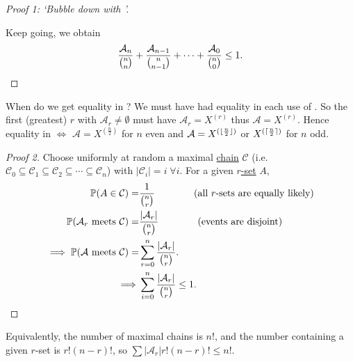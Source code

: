 \documentclass{article}
\DeclarePairedDelimiter\ceil{\lceil}{\rceil}
\DeclarePairedDelimiter\floor{\lfloor}{\rfloor}
\newcommand{\ihalf}[1]{\floor{\frac{#1}{2}}}
\newcommand{\ihalfc}[1]{\ceil{\frac{#1}{2}}}
\let\subset\subseteq
\begin{document}
\begin{proof}[Proof 1: `Bubble down with ']
\begin{center}
  \end{center}
  Keep going, we obtain
  \begin{equation*}
    \frac{\mathcal{A}_n}{\binom{n}{n}} + \frac{\mathcal{A}_{n-1}}{\binom{n}{n-1}} + \dotsm + \frac{\mathcal{A}_0}{\binom{n}{0}} \leq 1. \qedhere
  \end{equation*}
\end{proof}

When do we get equality in ?
We must have had equality in each use of .
So the first (greatest) $r$ with $\mathcal{A}_r \neq \emptyset$ must have $\mathcal{A}_r = X^{(r)}$ thus $\mathcal{\mathcal{A}} = X^{(r)}$.
Hence equality in  $\iff$ $\mathcal{A} = X^{(\frac{n}{2})}$ for $n$ even and $\mathcal{A} = X^{(\ihalf{n})}$ or $X^{(\ihalfc{n})}$ for $n$ odd.

\begin{proof}[Proof 2]
  Choose uniformly at random a maximal \hyperlink{def:chain}{chain} $\mathcal{C}$ (i.e.\ $\mathcal{C}_0 \subset \mathcal{C}_1 \subset \mathcal{C}_2 \subset \dotsb \subset \mathcal{C}_n$) with $|\mathcal{C}_i| = i \; \forall i$.
  For a given \hyperlink{def:superr}{$r$-set} $A$,
 \begin{align*}\mathbb{P}(A \in \mathcal{C}) = &\frac{1}{\binom{n}{r}} \qquad \qquad \text{(all $r$-sets are equally likely)} \\
    \mathbb{P}(\mathcal{A}_r \text{ meets } \mathcal{C}) = &\frac{|\mathcal{A}_r|}{\binom{n}{r}} \qquad \qquad \text{(events are disjoint)} \\
    \implies \mathbb{P}(\mathcal{A} \text{ meets }\mathcal{C}) = &\sum_{r=0}^n \frac{|\mathcal{A}_r|}{\binom{n}{r}}. \\
    \implies &\sum_{i=0}^n \frac{|\mathcal{A}_r|}{\binom{n}{r}} \leq 1. \qedhere
  \end{align*}
\end{proof}
\begin{remark}
  Equivalently, the number of maximal chains is $n!$, and the number containing a given $r$-set is $r! (n-r)!$, so $\sum |\mathcal{A}_r| r! (n-r)! \leq n!$.
\end{remark}
\end{document}
